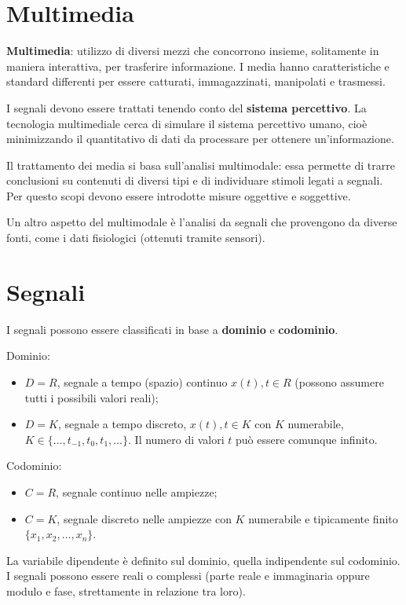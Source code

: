 \section{Multimedia}
\textbf{Multimedia}: utilizzo di diversi mezzi che concorrono insieme, solitamente in maniera interattiva, per trasferire informazione. I media hanno caratteristiche e standard differenti per essere catturati, immagazzinati, manipolati e trasmessi.

I segnali devono essere trattati tenendo conto del \textbf{sistema percettivo}. La tecnologia multimediale cerca di simulare il sistema percettivo umano, cioè minimizzando il quantitativo di dati da processare per ottenere un'informazione.

Il trattamento dei media si basa sull'analisi multimodale: essa permette di trarre conclusioni su contenuti di diversi tipi e di individuare stimoli legati a segnali. Per questo scopi devono essere introdotte misure oggettive e soggettive.

Un altro aspetto del multimodale è l'analisi da segnali che provengono da diverse fonti, come i dati fisiologici (ottenuti tramite sensori). 

\section{Segnali}
I segnali possono essere classificati in base a \textbf{dominio} e \textbf{codominio}.

Dominio: 
\begin{itemize}
	\item $D = R$, segnale a tempo (spazio) continuo $x(t), t \in R$ (possono assumere tutti i possibili valori reali);
	\item $D = K$, segnale a tempo discreto, $x(t), t \in K$ con $K$ numerabile, $K \in \{\dots, t_{-1}, t_0, t_1, \dots\}$. Il numero di valori $t$ può essere comunque infinito.
\end{itemize}

Codominio:
\begin{itemize}
	\item $C = R$, segnale continuo nelle ampiezze;
	\item $C = K$, segnale discreto nelle ampiezze con $K$ numerabile e tipicamente finito $\{x_1, x_2, \dots, x_n\}$.
\end{itemize}

La variabile dipendente è definito sul dominio, quella indipendente sul codominio. I segnali possono essere reali o complessi (parte reale e immaginaria oppure modulo e fase, strettamente in relazione tra loro).

